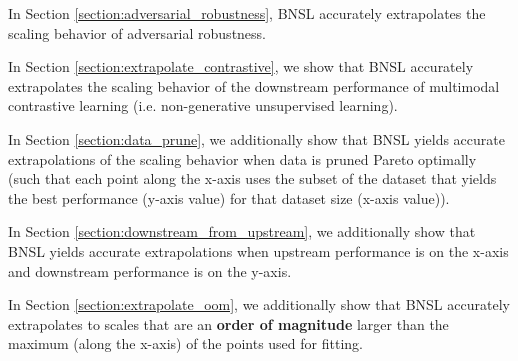\documentclass{article} %
\begin{document}
In Section \ref{section:adversarial_robustness}, BNSL accurately extrapolates the scaling behavior of adversarial robustness.

\vspace{-2.1mm}

In Section \ref{section:extrapolate_contrastive}, we show that BNSL accurately extrapolates the scaling behavior of the downstream performance of multimodal contrastive learning (i.e. non-generative unsupervised learning).

\vspace{-2.1mm}

In Section \ref{section:data_prune}, we additionally show that BNSL yields accurate extrapolations of the scaling behavior when data is pruned Pareto optimally (such that each point along the x-axis uses the subset of the dataset that yields the best performance (y-axis value) for that dataset size (x-axis value)).

\vspace{-2.1mm}

In Section \ref{section:downstream_from_upstream}, we additionally show that BNSL yields accurate extrapolations when upstream performance is on the x-axis and downstream performance is on the y-axis.

\vspace{-2.1mm}

In Section \ref{section:extrapolate_oom}, we additionally show that BNSL accurately extrapolates to scales that are an \textbf{order of magnitude} larger than the maximum (along the x-axis) of the points used for fitting.


\iffalse
\end{document}
